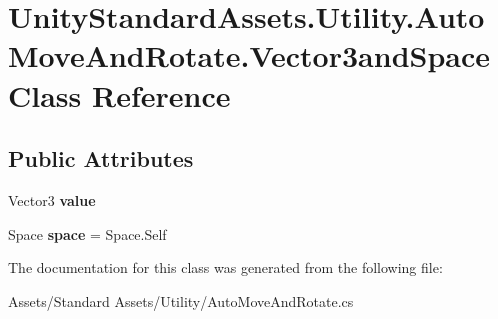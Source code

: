 \hypertarget{class_unity_standard_assets_1_1_utility_1_1_auto_move_and_rotate_1_1_vector3and_space}{}\section{Unity\+Standard\+Assets.\+Utility.\+Auto\+Move\+And\+Rotate.\+Vector3and\+Space Class Reference}
\label{class_unity_standard_assets_1_1_utility_1_1_auto_move_and_rotate_1_1_vector3and_space}
\subsection*{Public Attributes}
\begin{DoxyCompactItemize}
\item 
Vector3 {\bfseries value}\hypertarget{class_unity_standard_assets_1_1_utility_1_1_auto_move_and_rotate_1_1_vector3and_space_aab8bd7cedeb6c93b687a5693aeda36de}{}\label{class_unity_standard_assets_1_1_utility_1_1_auto_move_and_rotate_1_1_vector3and_space_aab8bd7cedeb6c93b687a5693aeda36de}

\item 
Space {\bfseries space} = Space.\+Self\hypertarget{class_unity_standard_assets_1_1_utility_1_1_auto_move_and_rotate_1_1_vector3and_space_a2530d3818ba403e264d03c0d06014f5b}{}\label{class_unity_standard_assets_1_1_utility_1_1_auto_move_and_rotate_1_1_vector3and_space_a2530d3818ba403e264d03c0d06014f5b}

\end{DoxyCompactItemize}


The documentation for this class was generated from the following file\+:\begin{DoxyCompactItemize}
\item 
Assets/\+Standard Assets/\+Utility/Auto\+Move\+And\+Rotate.\+cs\end{DoxyCompactItemize}
